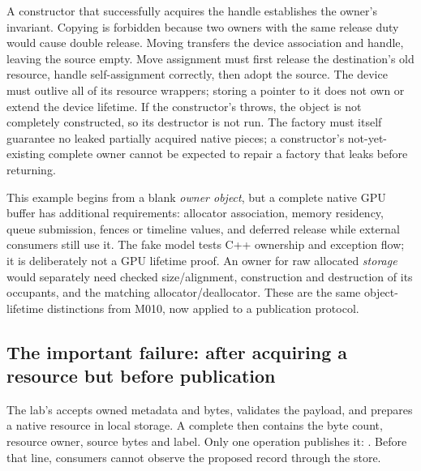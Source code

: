 A constructor that successfully acquires the handle establishes the owner's invariant. Copying is forbidden because two owners with the same release duty would cause double release. Moving transfers the device association and handle, leaving the source empty. Move assignment must first release the destination's old resource, handle self-assignment correctly, then adopt the source. The device must outlive all of its resource wrappers; storing a pointer to it does not own or extend the device lifetime. If the constructor's  throws, the  object is not completely constructed, so its destructor is not run. The factory must itself guarantee no leaked partially acquired native pieces; a constructor's not-yet-existing complete owner cannot be expected to repair a factory that leaks before returning.

This example begins from a blank \emph{owner object}, but a complete native GPU buffer has additional requirements: allocator association, memory residency, queue submission, fences or timeline values, and deferred release while external consumers still use it. The fake model tests C++ ownership and exception flow; it is deliberately not a GPU lifetime proof. An owner for raw allocated \emph{storage} would separately need checked size/alignment, construction and destruction of its occupants, and the matching allocator/deallocator. These are the same object-lifetime distinctions from M010, now applied to a publication protocol.

\subsection{The important failure: after acquiring a resource but before publication}\label{05-engine-i-ch004-the-important-failure-after-acquiring-a-resource-but-before-publication}

\hypertarget{05-engine-i-ch004-the-important-failure-after-acquiring-a-resource-but-before-publication}{}

The lab's  accepts owned metadata and bytes, validates the payload, and prepares a native resource in local storage. A complete  then contains the byte count, resource owner, source bytes and label. Only one operation publishes it: . Before that line, consumers cannot observe the proposed record through the store.

